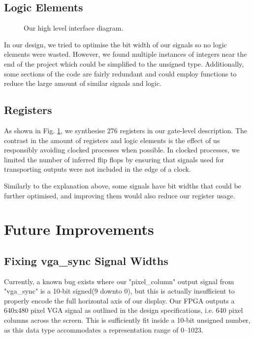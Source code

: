 \documentclass[conference]{IEEEtran}
\begin{document}
\subsection{Logic Elements}
\begin{figure}[htbp]
	\caption{Our high level interface diagram.}
	\label{fig:logic-elements}
\end{figure}

In our design, we tried to optimise the bit width of our signals so no logic elements were wasted. However, we found multiple instances of integers near the end of the project which could be simplified to the unsigned type. Additionally, some sections of the code are fairly redundant and could employ functions to reduce the large amount of similar signals and logic.

\subsection{Registers}
As shown in Fig. \ref{fig:logic-elements}, we synthesise 276 registers in our gate-level description. The contrast in the amount of registers and logic elements is the effect of us responsibly avoiding clocked processes when possible. In clocked processes, we limited the number of inferred flip flops by ensuring that signals used for transporting outputs were not included in the edge of a clock.

Similarly to the explanation above, some signals have bit widths that could be further optimised, and improving them would also reduce our register usage.

\section{Future Improvements}
\subsection{Fixing vga\_sync Signal Widths}
Currently, a known bug exists where our "pixel\_column" output signal from "vga\_sync" is a 10-bit signed(9 downto 0), but this is actually insufficient to properly encode the full horizontal axis of our display. Our FPGA outputs a 640x480 pixel VGA signal as outlined in the design specifications, i.e. 640 pixel columns across the screen. This is sufficiently fit inside a 10-bit unsigned number, as this data type accommodates a representation range of 0–1023.
\end{document}
